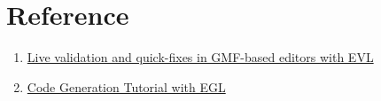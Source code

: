 \documentclass[12pt]{article}
\begin{document}
\pagebreak
\section{Reference}
\begin{enumerate}
    \item \href{https://www.eclipse.org/epsilon/doc/articles/evl-gmf-integration/}{Live validation and quick-fixes in GMF-based editors with EVL}
    \item \href{https://www.eclipse.org/epsilon/doc/articles/code-generation-tutorial-egl/}{Code Generation Tutorial with EGL}
\end{enumerate}
\end{document}
